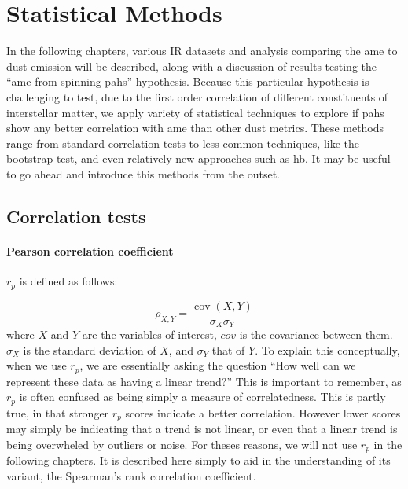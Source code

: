 \section{Statistical Methods}

    In the following chapters, various IR datasets and analysis comparing the \gls{ame} to dust emission will be described, along with a discussion of results testing the ``\gls{ame} from spinning \gls{pah}s'' hypothesis. Because this particular hypothesis is challenging to test, due to the first order correlation of different constituents of interstellar matter, we apply variety of statistical techniques to explore if \gls{pah}s show any better correlation with \gls{ame} than other dust metrics. These methods range from standard correlation tests to less common techniques, like the bootstrap test, and even relatively new approaches such as \gls{hb}. It may be useful to go ahead and introduce this methods from the outset.

    \subsection{Correlation tests}

    \paragraph{Pearson correlation coefficient}
     $r_{p}$ is defined as follows:

     \begin{equation}
       \rho_{X,Y}= \frac{\operatorname{cov}(X,Y)}{\sigma_X \sigma_Y}
     \end{equation}
     where $X$ and $Y$ are the variables of interest, $cov$ is the covariance between them. $\sigma_{X}$ is the standard deviation of $X$, and $\sigma_{Y}$ that of $Y$.
   To explain this conceptually, when we use $r_{p}$, we are essentially asking the question ``How well can we represent these data as having a linear trend?'' This is important to remember, as $r_{p}$ is often confused as being simply a measure of correlatedness. This is partly true, in that stronger $r_{p}$ scores indicate a better correlation. However lower scores may simply be indicating that a trend is not linear, or even that a linear trend is being overwheled by outliers or noise. For theses reasons, we will not use $r_{p}$ in the following chapters. It is described here simply to aid in the understanding of its variant, the Spearman's rank correlation coefficient.

